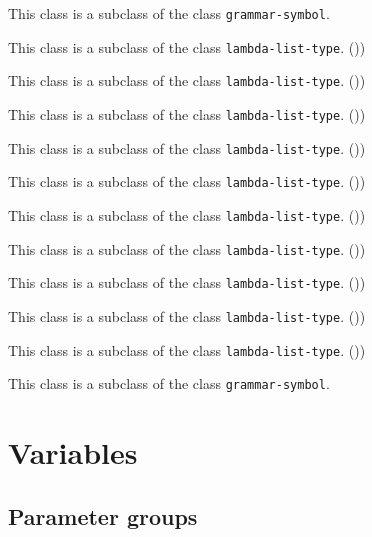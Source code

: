 
This class is a subclass of the class \texttt{grammar-symbol}.


This class is a subclass of the class \texttt{lambda-list-type}. ())


This class is a subclass of the class \texttt{lambda-list-type}. ())


This class is a subclass of the class \texttt{lambda-list-type}. ())


This class is a subclass of the class \texttt{lambda-list-type}. ())


This class is a subclass of the class \texttt{lambda-list-type}. ())


This class is a subclass of the class \texttt{lambda-list-type}. ())


This class is a subclass of the class \texttt{lambda-list-type}. ())


This class is a subclass of the class \texttt{lambda-list-type}. ())


This class is a subclass of the class \texttt{lambda-list-type}. ())


This class is a subclass of the class \texttt{lambda-list-type}. ())


This class is a subclass of the class \texttt{grammar-symbol}.

\section{Variables}

\subsection{Parameter groups}

